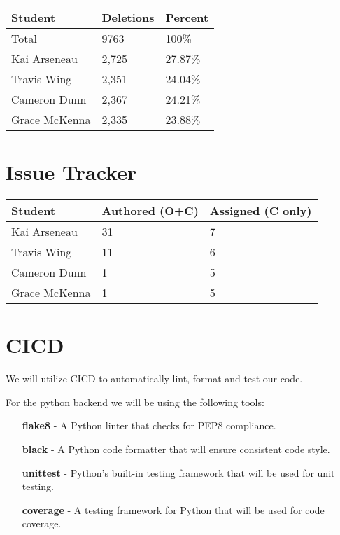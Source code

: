 \documentclass{article}
\begin{document}
\begin{table}[H]
  \centering
  \begin{tabular}{lll}
  \toprule
  \textbf{Student} & \textbf{Deletions} & \textbf{Percent}\\
  \midrule
  Total & 9763 & 100\% \\
  Kai Arseneau & 2,725 & 27.87\% \\
  Travis Wing & 2,351 & 24.04\% \\
  Cameron Dunn & 2,367 & 24.21\% \\
  Grace McKenna & 2,335 & 23.88\% \\
  \bottomrule
  \end{tabular}
\end{table}



\section{Issue Tracker}



\begin{table}[H]
\centering
\begin{tabular}{lll}
\toprule
\textbf{Student} & \textbf{Authored (O+C)} & \textbf{Assigned (C only)}\\
\midrule
Kai Arseneau & 31 & 7 \\
Travis Wing & 11 & 6 \\
Cameron Dunn & 1 & 5 \\
Grace McKenna & 1 & 5 \\
\bottomrule
\end{tabular}
\end{table}


\section{CICD}

We will utilize CICD to automatically lint, format and test our code. 

For the python backend we will be using the following tools:
\begin{itemize}
  \item [\textbf{flake8}] - A Python linter that checks for PEP8 compliance.
  \item [\textbf{black}] - A Python code formatter that will ensure consistent code style.
  \item [\textbf{unittest}] - Python's built-in testing framework that will be used for unit testing.
  \item [\textbf{coverage}] - A testing framework for Python that will be used for code coverage.
\end{itemize}
\end{document}
